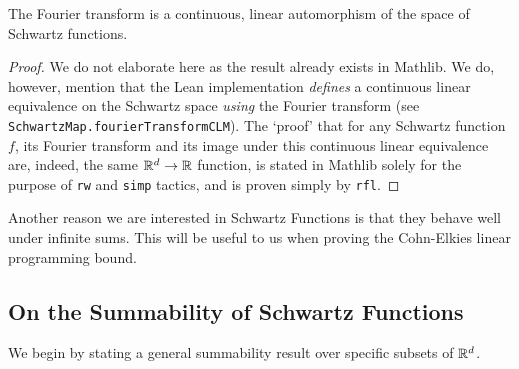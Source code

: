 \begin{lemma}\label{lemma:Fourier-transform-is-automorphism}\leanok
  The Fourier transform is a continuous, linear automorphism of the space of Schwartz functions.
\end{lemma}
\begin{proof}\leanok
  We do not elaborate here as the result already exists in Mathlib. We do, however, mention that the Lean implementation \emph{defines} a continuous linear equivalence on the Schwartz space \emph{using} the Fourier transform (see \verb|SchwartzMap.fourierTransformCLM|). The `proof' that for any Schwartz function $f$, its Fourier transform and its image under this continuous linear equivalence are, indeed, the same $\mathbb{R}^d \to \mathbb{R}$ function, is stated in Mathlib solely for the purpose of \verb|rw| and \verb|simp| tactics, and is proven simply by \verb|rfl|.
\end{proof}

Another reason we are interested in Schwartz Functions is that they behave well under infinite sums. This will be useful to us when proving the Cohn-Elkies linear programming bound.

\subsection{On the Summability of Schwartz Functions}

We begin by stating a general summability result over specific subsets of $\mathbb{R}^d$.

